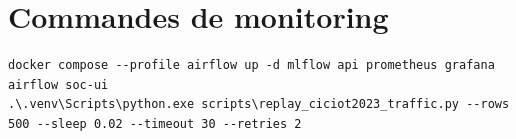 
\section{Commandes de monitoring}
\begin{lstlisting}
docker compose --profile airflow up -d mlflow api prometheus grafana airflow soc-ui
.\.venv\Scripts\python.exe scripts\replay_ciciot2023_traffic.py --rows 500 --sleep 0.02 --timeout 30 --retries 2
\end{lstlisting}
